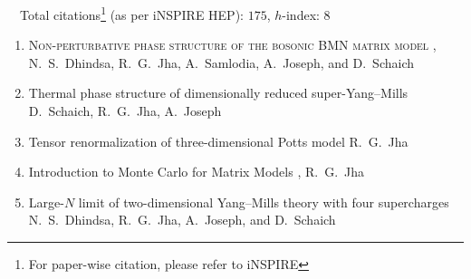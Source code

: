  {\faLeanpub}
~~Total citations\footnote{For paper-wise citation, please refer to iNSPIRE} (as per iNSPIRE HEP): $175$, $h$-index: $8$
\begin{enumerate}
\item \textsc{Non-perturbative phase structure of the bosonic BMN matrix model}  \newline 
\hfill  {},    \newline 	
N.~S.~Dhindsa, R.~G.~Jha, A.~Samlodia, A.~Joseph, and D.~Schaich
\vspace{1mm} 
\item Thermal phase structure of dimensionally reduced super-Yang--Mills \newline 
{} \newline 
D.~Schaich, R.~G.~Jha, A.~Joseph
\vspace{1mm} 
\item Tensor renormalization of three-dimensional Potts model  \newline 
{} \newline 
R.~G.~Jha
\vspace{1mm} 
 \item Introduction to Monte Carlo for Matrix Models \newline 
{},  \newline  
 R.~G.~Jha
 \vspace{1mm} 
 \item Large-$N$ limit of two-dimensional Yang--Mills theory with four supercharges \newline 
{} \newline 
 N.~S.~Dhindsa, R.~G.~Jha, A.~Joseph, and D.~Schaich
 \vspace{1mm}  

\end{enumerate}
